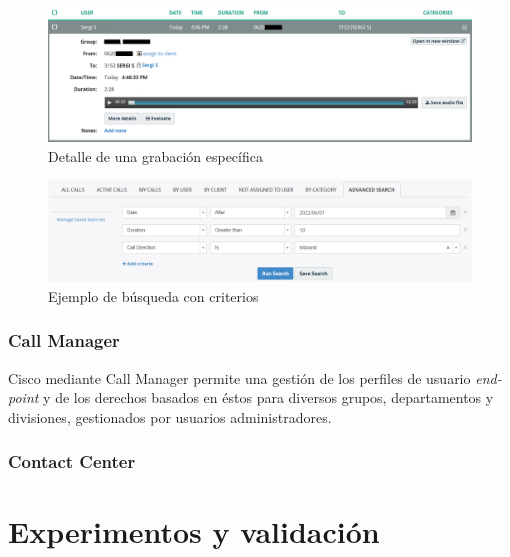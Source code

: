 \documentclass[a4paper, 12pt]{book}
\begin{document}
\begin{figure}
  \centering
  \includegraphics[scale=0.65]{img/fig_grabaciones_02}
  \caption{Detalle de una grabación específica}
  \label{figura:fig_grabaciones_02}
\end{figure}

\begin{figure}
  \centering
  \includegraphics[scale=0.65]{img/fig_filtros}
  \caption{Ejemplo de búsqueda con criterios}
  \label{figura:fig_filtros}
\end{figure}


\subsection{Call Manager}
\label{sec:call_manager}

Cisco mediante Call Manager permite una gestión de los perfiles de usuario \emph{end-point} y de los derechos basados en éstos para diversos grupos, departamentos y divisiones, gestionados por usuarios administradores.

\subsection{Contact Center}
\label{sec:contact_center}



\cleardoublepage
\chapter{Experimentos y validación}
\end{document}
